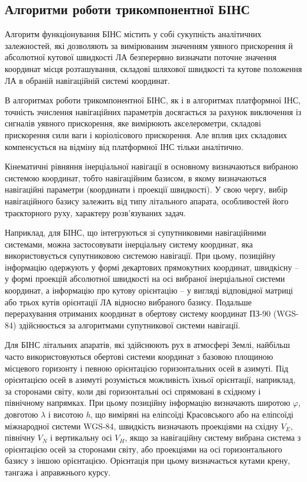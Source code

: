 \subsection{Алгоритми роботи трикомпонентної БІНС}

Алгоритм функціонування БІНС містить у собі сукупність аналітичних залежностей, які 
дозволяють за вимірюваним значенням уявного прискорення й абсолютної кутової швидкості 
ЛА безперервно визначати поточне значення координат місця розташування, складові 
шляхової швидкості та кутове положення ЛА в обраній навігаційній системі координат.

В алгоритмах роботи  трикомпонентної БІНС, як і в алгоритмах платформної ІНС, точність 
зчислення навігаційних параметрів досягається за рахунок виключення із сигналів уявного 
прискорення, яке вимірюють акселерометри, складові прискорення сили ваги і коріолісового 
прискорення. Але вплив цих складових компенсується на відміну від платформної ІНС 
тільки аналітично. 

Кінематичні рівняння інерціальної  навігації в основному визначаються вибраною системою 
координат, тобто навігаційним базисом, в якому визначаються навігаційні параметри 
(координати і проекції швидкості). У свою чергу, вибір навігаційного базису залежить 
від типу літального апарата, особливостей його траєкторного руху, характеру розв'язуваних 
задач.

Наприклад, для БІНС, що інтегруються зі супутниковими навігаційними системами, можна 
застосовувати інерціальну систему координат, яка використовується супутниковою системою 
навігації.  При цьому, позиційну інформацію одержують у формі декартових прямокутних 
координат, швидкісну -- у формі проекцій абсолютної швидкості на осі вибраної інерціальної 
системи координат, а інформацію про кутову орієнтацію -- у вигляді відповідної матриці 
або трьох кутів орієнтації ЛА відносно вибраного базису. Подальше перерахування отриманих 
координат в обертову систему координат ПЗ-90 (WGS-84) здійснюється за алгоритмами 
супутникової системи навігації.

Для БІНС літальних апаратів, які здійснюють рух в атмосфері Землі, найбільш часто 
використовуються обертові системи координат з базовою площиною місцевого горизонту 
і певною орієнтацією горизонтальних осей в азимуті. Під орієнтацією осей в азимуті 
розуміється можливість їхньої орієнтації, наприклад, за сторонами світу, коли дві 
горизонтальні осі спрямовані в східному і північному напрямках. При цьому позиційну 
інформацію визначають широтою $\varphi$, довготою $\lambda$ і висотою \textit{h}, 
що виміряні на еліпсоїді Красовського або на еліпсоїді міжнародної системи WGS-84, 
швидкість визначають проекціями на східну $V_E$, північну $V_N$ і вертикальну 
осі $V_H$, якщо за навігаційну систему вибрана система з орієнтацією осей за 
сторонами світу, або проекціями на осі горизонтального базису з іншою орієнтацією. 
Орієнтація при цьому визначається кутами крену, тангажа і аправжнього курсу.

